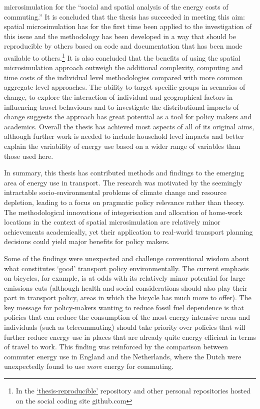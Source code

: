 microsimulation for the ``social and spatial analysis of the energy costs of
commuting.'' It is concluded that the thesis has succeeded in meeting this aim:
spatial microsimulation has for the first time been applied to the
investigation of this issue and the methodology has been developed in a way
that should be reproducible by others based on code and documentation that has
been made available to others.\footnote{In
the
{\color{blue}\href{https://github.com/Robinlovelace/thesis-reproducible}
{`thesis-reproducible'}} repository
and other personal repositories hosted on the social coding site github.com
}
It is also concluded that the benefits of using the spatial microsimulation
approach outweigh the additional complexity, computing and time costs of the
individual level methodologies compared with more common aggregate level
approaches. The ability to target specific groups in scenarios of change, to
explore the interaction of individual and geographical factors in influencing
travel behaviours and to investigate the distributional impacts of change
suggests the approach has great potential as a tool for policy makers and
academics. Overall the thesis has achieved most aspects of all of its original
aims, although further work is needed to include household level impacts and
better explain the variability of energy use based on a wider range of
variables than those used here.

In summary, this thesis has contributed methods and findings to the emerging
area of energy use in transport. The research was motivated by the seemingly
intractable socio-environmental problems of climate change and resource
depletion, leading to a focus on pragmatic policy relevance rather than theory.
The methodological innovations of integerisation and allocation of home-work
locations in the context of spatial microsimulation are relatively minor
achievements academically, yet their application to real-world transport
planning decisions could yield major benefits for policy makers.

Some of the findings were unexpected and challenge conventional wisdom about
what constitutes `good' transport policy environmentally. The current
emphasis on bicycles, for example, is at odds with its relatively
minor potential for large emissions cuts (although health and social
considerations should also play their part in transport policy, areas
in which the bicycle has much more to offer).
The key message for policy-makers wanting to reduce fossil fuel dependence
is that policies that can reduce the consumption
of the most energy intensive areas and individuals (such as telecommuting)
should take priority over policies that will further reduce energy use in
places that are already quite energy efficient in terms of travel to work.
This finding was reinforced by the comparison between 
commuter energy use in England and the Netherlands, where the Dutch were
unexpectedly found to use \emph{more} energy for commuting. 

